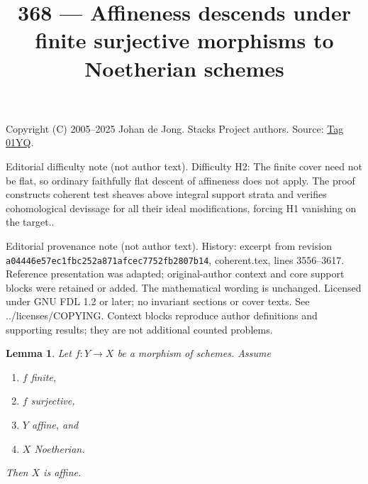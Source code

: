 \documentclass{amsart}
\theoremstyle{plain}
\newtheorem{lemma}[subsection]{Lemma}
\theoremstyle{definition}
\theoremstyle{remark}
\numberwithin{equation}{subsection}
\begin{document}
\title[Stacks Project, Tag 01YQ]{368 --- Affineness descends under finite surjective morphisms to Noetherian schemes}
\maketitle
\noindent Copyright (C) 2005--2025 Johan de Jong. Stacks Project authors. Source: \href{https://stacks.math.columbia.edu/tag/01YQ}{Tag 01YQ}.

\noindent Editorial difficulty note (not author text). Difficulty H2: The finite cover need not be flat, so ordinary faithfully flat descent of affineness does not apply. The proof constructs coherent test sheaves above integral support strata and verifies cohomological devissage for all their ideal modifications, forcing H1 vanishing on the target..

\noindent Editorial provenance note (not author text). History: excerpt from revision \texttt{a0444\allowbreak 6e57e\allowbreak c1fbc\allowbreak 252a8\allowbreak 71afc\allowbreak ec775\allowbreak 2fb28\allowbreak 07b14}, coherent.tex, lines 3556--3617. Reference presentation was adapted; original-author context and core support blocks were retained or added. The mathematical wording is unchanged. Licensed under GNU FDL 1.2 or later; no invariant sections or cover texts. See ../licenses/COPYING. Context blocks reproduce author definitions and supporting results; they are not additional counted problems.

\begin{lemma}
\label{lemma-image-affine-finite-morphism-affine-Noetherian}
Let $f : Y \to X$ be a morphism of schemes.
Assume
\begin{enumerate}
\item $f$ finite,
\item $f$ surjective,
\item $Y$ affine, and
\item $X$ Noetherian.
\end{enumerate}
Then $X$ is affine.
\end{lemma}
\end{document}
